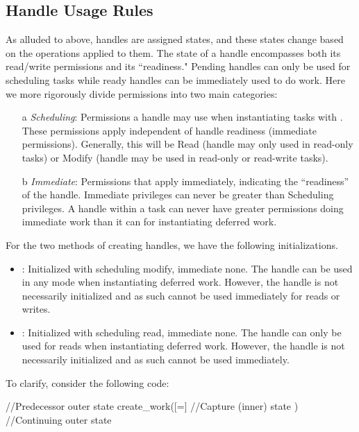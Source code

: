 \subsection{Handle Usage Rules}
\label{sec:handlerules}
As alluded to above, \glspl{handle} are assigned states, and these states change 
based on the operations applied to them.  
The state of a \gls{handle} encompasses both its read/write permissions and its ``readiness."
Pending \glspl{handle} can only be used for scheduling \glspl{task} while
ready \glspl{handle} can be immediately used to do work.
Here we more rigorously divide permissions into two main categories: 
\begin{itemize}
  \item[a] {\it Scheduling}: Permissions a \gls{handle} may use when instantiating
  tasks with .
These permissions apply independent of handle readiness (immediate permissions). 
Generally, this will be Read (\gls{handle} may only used in read-only
\glspl{task}) or Modify (\gls{handle} may be used in read-only or read-write
\glspl{task}). 
\item[b] {\it Immediate}: Permissions that apply immediately, indicating the
  ``readiness'' of the \gls{handle}.  Immediate privileges can never be greater than Scheduling privileges.
  A handle within a \gls{task} can never have greater permissions doing immediate work than it can for instantiating deferred work.
\end{itemize}

For the two methods of creating handles, we have the following initializations.
\begin{itemize}
\item {}: Initialized with scheduling modify, immediate none. 
The handle can be used in any mode when instantiating deferred work.
However, the handle is not necessarily initialized and as such cannot be used immediately for reads or writes.
%
\item {}: Initialized with scheduling read, immediate none.
The handle can only be used for reads when instantiating deferred work.
However, the handle is not necessarily initialized and as such cannot be used immediately.
\end{itemize}

To clarify, consider the following code:
\begin{CppCode}
//Predecessor outer state
create_work([=]{
  //Capture (inner) state
})
//Continuing outer state
\end{CppCode}

